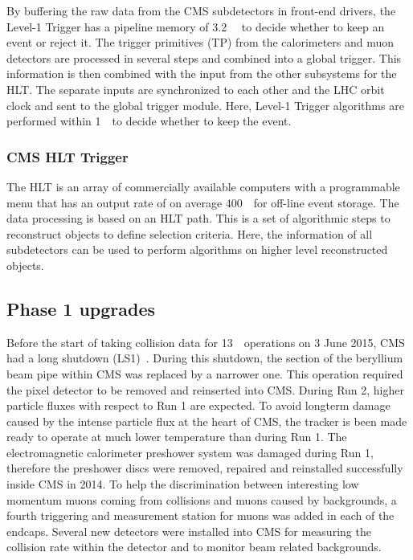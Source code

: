 By buffering the raw data from the CMS subdetectors in front-end drivers, the Level-1 Trigger has a pipeline memory of 3.2~ \micro \second\ to decide whether to keep an event or reject it. 
The trigger primitives (TP) from the calorimeters and muon detectors are processed in several steps and combined into a global trigger. This information is then combined with the input from the other subsystems for the HLT. The separate inputs are synchronized to each other and the LHC orbit clock and sent to the global trigger module. Here, Level-1 Trigger algorithms are performed within 1~\micro \second\ to decide whether to  keep the event. 


\subsubsection*{CMS HLT Trigger}
The HLT is an array of commercially available computers with a programmable menu that has an output rate of on average 400~\hertz\ for off-line event storage.
The data processing is based on an HLT path. This is a  set of algorithmic steps to reconstruct objects to define selection criteria.  Here, the information of all subdetectors can be used to perform algorithms on higher level reconstructed objects. 

\subsection{Phase 1 upgrades}
\label{sec:Phase1}
Before the start of taking collision data for 13~\TeV\ operations on 3 June 2015, CMS had a long shutdown (LS1)~\cite{Pralavorio:2024977}. During this shutdown, the section of the beryllium beam pipe within CMS was replaced by a narrower one. This operation required the pixel detector to be  removed and reinserted into CMS. During Run 2, higher particle fluxes with respect to Run 1 are expected. To avoid longterm damage caused by the intense particle flux at the heart of CMS, the tracker is been made ready to operate at much lower temperature than during Run 1.  The electromagnetic calorimeter preshower system was damaged during Run 1, therefore the preshower discs were removed, repaired and reinstalled successfully inside CMS in 2014. To help the discrimination between interesting low momentum muons coming from collisions and muons caused by backgrounds, a fourth triggering and measurement station for muons was added in each of the endcaps. Several new detectors were installed into CMS for measuring the collision rate within the detector and to monitor beam related backgrounds. 

